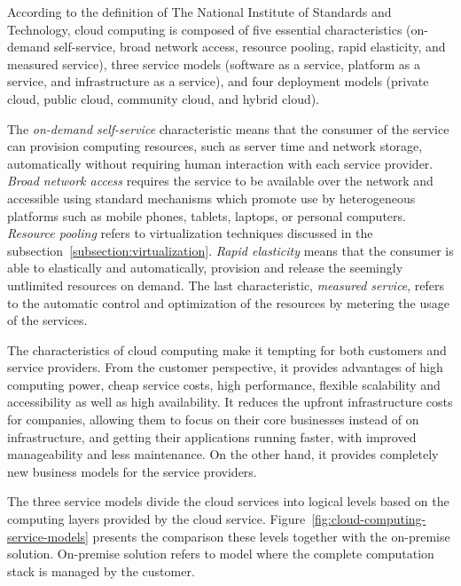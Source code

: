 According to the definition of The National Institute of Standards and Technology, cloud computing is composed of five essential characteristics (on-demand self-service, broad network access, resource pooling, rapid elasticity, and measured service), three service models (software as a service, platform as a service, and infrastructure as a service), and four deployment models (private cloud, public cloud, community cloud, and hybrid cloud).~\cite{Mell:2011:ccdef}

The \emph{on-demand self-service} characteristic means that the consumer of the service can provision computing resources, such as server time and network storage, automatically without requiring human interaction with each service provider. \emph{Broad network access} requires the service to be available over the network and accessible using standard mechanisms which promote use by heterogeneous platforms such as mobile phones, tablets, laptops, or personal computers. \emph{Resource pooling} refers to virtualization techniques discussed in the subsection~\ref{subsection:virtualization}. \emph{Rapid elasticity} means that the consumer is able to elastically and automatically, provision and release the seemingly untlimited resources on demand. The last characteristic, \emph{measured service}, refers to the automatic control and optimization of the resources by metering the usage of the services.~\cite{Mell:2011:ccdef}

The characteristics of cloud computing make it tempting for both customers and service providers. From the customer perspective, it provides advantages of high computing power, cheap service costs, high performance, flexible scalability and accessibility as well as high availability. It reduces the upfront infrastructure costs for companies, allowing them to focus on their core businesses instead of on infrastructure, and getting their applications running faster, with improved manageability and less maintenance. On the other hand, it provides completely new business models for the service providers.~\cite{Mell:2011:ccdef, Dikaiakos:2009:Cloud}

The three service models divide the cloud services into logical levels based on the computing layers provided by the cloud service. Figure~\ref{fig:cloud-computing-service-models} presents the comparison these levels together with the on-premise solution. On-premise solution refers to model where the complete computation stack is managed by the customer.

